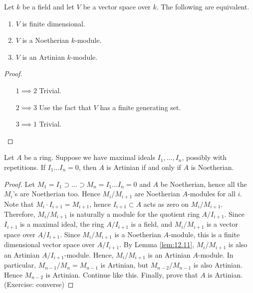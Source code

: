 
\begin{lemma}
\label{lem:12.11}
Let $ k $ be a field and let $ V $ be a vector space over $ k $. The following are equivalent.
\begin{enumerate}
\item $ V $ is finite dimensional.
\item $ V $ is a Noetherian $ k $-module.
\item $ V $ is an Artinian $ k $-module.
\end{enumerate}
\end{lemma}

\begin{proof}
\hfill
\begin{itemize}[leftmargin=0.5in]
\item[$ 1 \implies 2 $] Trivial.
\item[$ 2 \implies 3 $] Use the fact that $ V $ has a finite generating set.
\item[$ 3 \implies 1 $] Trivial.
\end{itemize}
\end{proof}

\begin{lemma}
\label{lem:12.12}
Let $ A $ be a ring. Suppose we have maximal ideals $ I_1, \dots, I_n $, possibly with repetitions. If $ I_1 \dots I_n = 0 $, then $ A $ is Artinian if and only if $ A $ is Noetherian.
\end{lemma}

\begin{proof}
Let $ M_1 = I_1 \supset \dots \supset M_n = I_1 \dots I_n = 0 $ and $ A $ be Noetherian, hence all the $ M_i $'s are Noetherian too. Hence $ M_i / M_{i + 1} $ are Noetherian $ A $-modules for all $ i $. Note that $ M_i \cdot I_{i + 1} = M_{i + 1} $, hence $ I_{i + 1} \subset A $ acts as zero on $ M_i / M_{i + 1} $. Therefore, $ M_i / M_{i + 1} $ is naturally a module for the quotient ring $ A / I_{i + 1} $. Since $ I_{i + 1} $ is a maximal ideal, the ring $ A / I_{i + 1} $ is a field, and $ M_i / M_{i + 1} $ is a vector space over $ A / I_{i + 1} $. Since $ M_i / M_{i + 1} $ is a Noetherian $ A $-module, this is a finite dimensional vector space over $ A / I_{i + 1} $. By Lemma \ref{lem:12.11}, $ M_i / M_{i + 1} $ is also an Artinian $ A / I_{i + 1} $-module. Hence, $ M_i / M_{i + 1} $ is an Artinian $ A $-module. In particular, $ M_{n - 1} / M_n = M_{n - 1} $ is Artinian, but $ M_{n - 2} / M_{n - 1} $ is also Artinian. Hence $ M_{n - 2} $ is Artinian. Continue like this. Finally, prove that $ A $ is Artinian. (Exercise: converse)
\end{proof}

